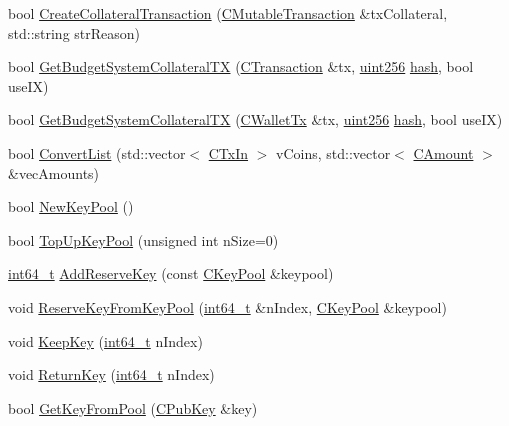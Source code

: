 \begin{DoxyCompactItemize}
\item 
bool \hyperlink{class_c_wallet_a7fce7ef2029f265caf93d4db3bdb70c3}{Create\+Collateral\+Transaction} (\hyperlink{struct_c_mutable_transaction}{C\+Mutable\+Transaction} \&tx\+Collateral, std\+::string str\+Reason)
\item 
bool \hyperlink{class_c_wallet_a7e5345f36180c9133bbbac9b1e2c9fb6}{Get\+Budget\+System\+Collateral\+T\+X} (\hyperlink{class_c_transaction}{C\+Transaction} \&tx, \hyperlink{classuint256}{uint256} \hyperlink{cache_8cc_a11ecb029164e055f28f4123ce3748862}{hash}, bool use\+I\+X)
\item 
bool \hyperlink{class_c_wallet_ade832913e51777e2b25255d54ef3e583}{Get\+Budget\+System\+Collateral\+T\+X} (\hyperlink{class_c_wallet_tx}{C\+Wallet\+Tx} \&tx, \hyperlink{classuint256}{uint256} \hyperlink{cache_8cc_a11ecb029164e055f28f4123ce3748862}{hash}, bool use\+I\+X)
\item 
bool \hyperlink{class_c_wallet_a8b3d2bb029430a437780037c5db7c0e0}{Convert\+List} (std\+::vector$<$ \hyperlink{class_c_tx_in}{C\+Tx\+In} $>$ v\+Coins, std\+::vector$<$ \hyperlink{amount_8h_a4eaf3a5239714d8c45b851527f7cb564}{C\+Amount} $>$ \&vec\+Amounts)
\item 
bool \hyperlink{class_c_wallet_a7353ba1e79fc4167fbfbe79b41698fa7}{New\+Key\+Pool} ()
\item 
bool \hyperlink{class_c_wallet_aeeeca131336b2ec20cede9a2fccc203a}{Top\+Up\+Key\+Pool} (unsigned int n\+Size=0)
\item 
\hyperlink{stdint_8h_adec1df1b8b51cb32b77e5b86fff46471}{int64\+\_\+t} \hyperlink{class_c_wallet_afecefdad197b3b021139cef1fd0e7a9b}{Add\+Reserve\+Key} (const \hyperlink{class_c_key_pool}{C\+Key\+Pool} \&keypool)
\item 
void \hyperlink{class_c_wallet_a9921854840668a1856998f041177dd2b}{Reserve\+Key\+From\+Key\+Pool} (\hyperlink{stdint_8h_adec1df1b8b51cb32b77e5b86fff46471}{int64\+\_\+t} \&n\+Index, \hyperlink{class_c_key_pool}{C\+Key\+Pool} \&keypool)
\item 
void \hyperlink{class_c_wallet_ae460b8c824a1a6633615f95373e533f2}{Keep\+Key} (\hyperlink{stdint_8h_adec1df1b8b51cb32b77e5b86fff46471}{int64\+\_\+t} n\+Index)
\item 
void \hyperlink{class_c_wallet_a4ee5566c2b4c8f4ed5cec628573b9275}{Return\+Key} (\hyperlink{stdint_8h_adec1df1b8b51cb32b77e5b86fff46471}{int64\+\_\+t} n\+Index)
\item 
bool \hyperlink{class_c_wallet_a18549ec5c472c003afc4794daeb9adfd}{Get\+Key\+From\+Pool} (\hyperlink{class_c_pub_key}{C\+Pub\+Key} \&key)

\end{DoxyCompactItemize}
